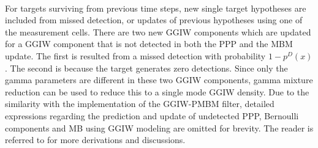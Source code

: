 ~\\
For targets surviving from previous time steps, new single target hypotheses are included from missed detection, or updates of previous hypotheses using one of the measurement cells. There are two new GGIW components which are updated for a GGIW component that is not detected in both the PPP and the MBM update. The first is resulted from a missed detection with probability $1-p^D(x)$. The second is because the target generates zero detections. Since only the gamma parameters are different in these two GGIW components, gamma mixture reduction \cite{gammareduction} can be used to reduce this to a single mode GGIW density. Due to the similarity with the implementation of the GGIW-PMBM filter, detailed expressions regarding the prediction and update of undetected PPP, Bernoulli components and MB using GGIW modeling are omitted for brevity. The reader is referred to \cite{pmbmextended2} for more derivations and discussions.

